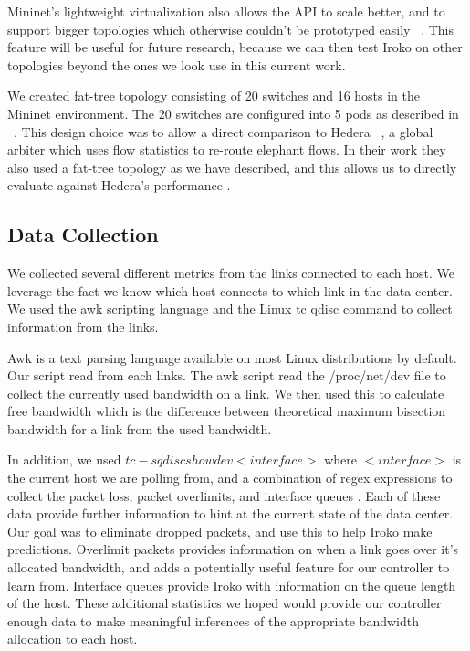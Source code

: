 Mininet’s lightweight virtualization also allows the API to scale better, and to support bigger topologies which otherwise couldn’t be prototyped easily ~\cite{mininet}. This feature will be useful for future research, because we can then test Iroko on other topologies beyond the ones we look use in this current work. 

We created  fat-tree topology consisting of 20 switches and 16 hosts in the Mininet environment. The 20 switches are configured into 5 pods as described in ~\cite{fattree}. This design choice was to allow a direct comparison to Hedera  ~\cite{hedera}, a global arbiter which uses flow statistics to re-route elephant flows. In their work they also used a fat-tree topology as we have described, and this allows us to directly evaluate against Hedera's performance . 

\subsection{Data Collection }
We collected several different metrics from the links connected to each host. We leverage the fact we know which host connects to which link in the data center. We used the awk scripting language and the Linux tc qdisc command to collect information from the links. 

Awk is a text parsing language available on most Linux distributions by default. Our script read from each links. The awk script read the /proc/net/dev file to collect the currently used  bandwidth on a link. We then used this to calculate free bandwidth which is the difference between theoretical maximum bisection bandwidth for a link from the used bandwidth.

In addition, we used $tc -s qdisc show dev <interface>$ where $<interface>$ is the current host we are polling from, and a combination of regex expressions to collect the packet loss, packet overlimits, and interface queues . Each of these data provide further information to hint at the current state of the data center. Our goal was to eliminate dropped packets, and use this to help Iroko make predictions. Overlimit packets provides information on when a link goes over it’s allocated bandwidth, and adds a potentially useful feature for our controller to learn from. Interface queues provide Iroko with information on the queue length of the host.  These additional statistics we hoped would provide our controller enough data to make meaningful inferences of the appropriate bandwidth allocation to each host. 

